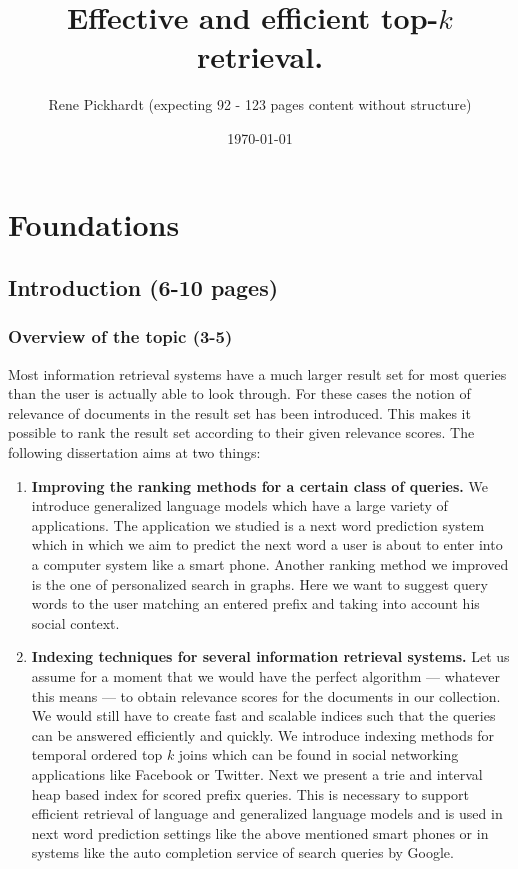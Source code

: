 \documentclass[•]{book}
\title{Effective and efficient top-$k$ retrieval.}
\author{Rene Pickhardt (expecting 92 - 123 pages content without structure)}
\date{\today}
\begin{document}
\maketitle
\tableofcontents

\part{Foundations}
\chapter{Introduction (6-10 pages)}
\section{Overview of the topic (3-5)}
Most information retrieval systems \cite{} have a much larger result set for most queries than the user is actually able to look through.
For these cases the notion of relevance of documents in the result set has been introduced. 
This makes it possible to rank the result set according to their given relevance scores.
The following dissertation aims at two things: 

\begin{enumerate}
\item \textbf{Improving the ranking methods for a certain class of queries.}
We introduce generalized language models which have a large variety of applications\cite{own:typology:2013}. 
The application we studied is a next word prediction system which in which we aim to predict the next word a user is about to enter into a computer system like a smart phone. 
Another ranking method we improved is the one of personalized search in graphs\cite{own:graphSearch:2013}.
Here we want to suggest query words to the user matching an entered prefix and taking into account his social context.

\item \textbf{Indexing techniques for several information retrieval systems.}
Let us assume for a moment that we would have the perfect algorithm --- whatever this means --- to obtain relevance scores for the documents in our collection.
We would still have to create fast and scalable indices such that the queries can be answered efficiently and quickly.
We introduce indexing methods for temporal ordered top $k$ joins \cite{own:graphity:2012} which can be found in social networking applications like Facebook or Twitter.
Next we present a trie and interval heap based index for scored prefix queries\cite{own:prefix:2013}. 
This is necessary to support efficient retrieval of language and generalized language models and is used in next word prediction settings like the above mentioned smart phones or in systems like the auto completion service of search queries by Google.
\end{enumerate}
\end{document}
